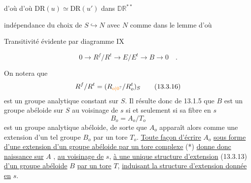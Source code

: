 d'où
d'où $\mathrm{DR}(u)\simeq\mathrm{DR}(u')$ dans $\mathbb{DR}^{**}$

indépendance du choix de $S\hookrightarrow N$ avec $N$ comme dans le lemme
d'où

Transitivité évidente par diagramme
\hfill IX

\[
0\longrightarrow R^f/R^t\longrightarrow E/E^t\longrightarrow B\longrightarrow 0\quad . \tag*{(13.3.15)}
\]

On notera que
\[
R^f/R^t=(R_{\unsure{o|0}}/R_o^t)_S \tag*{(13.3.16)}
\]
est un groupe analytique constant sur $S$. Il résulte donc de 13.1.5 que $B$ est un groupe abéloide sur $S$ au voisinage de $s$ si et seulement si sa fibre en $s$
\[
B_o=A_o/T_o
\]
est un groupe analytique abéloide, de sorte que $A_o$ apparaît alors comme une extension d'un tel groupe $B_o$ par un tore $T_o$. \uline{Toute façon d'écrire} $A_o$ \uline{sous forme d'une extension d'un groupe abéloide par un tore complexe} (*) \uline{donne donc naissance sur} $A$ , \uline{au voisinage de} $s$, \uline{à une unique structure d'extension} (13.3.13) \uline{d'un groupe abéloide} $B$ \uline{par un tore} $T$, \uline{induisant la structure d'extension donnée en} $s$.

